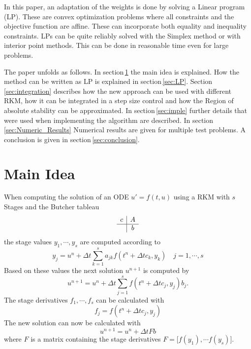 \documentclass[a4paper]{scrartcl}
\numberwithin{equation}{section}
\theoremstyle{plain}
\theoremstyle{definition}
\numberwithin{theorem}{section}
\newcommand{\dt}{{\Delta t}}
\newcommand{\1}{\mathbbm{1}}
\begin{document}
In this paper, an adaptation of the weights is done by solving a Linear program (LP).
These are convex optimization problems where all constraints and the objective function are affine. These can incorporate both equality and inequality constraints. 
LPs can be quite reliably solved with the Simplex method or with interior point methods. This can be done in reasonable time even for large problems. 
\cite{boyd_convex_2004}

The paper unfolds as follows. In section\,\ref{sec:main_idea} the main idea is explained. How the method can be written as LP is explained in section\,\ref{sec:LP}.
Section\,\ref{sec:integration} describes how the new approach can be used with different RKM, how it can be integrated in a step size control and how the Region of absolute stability can be approximated.  
In section\,\ref{sec:imple} further details that were used when implementing the algorithm are described.
In section\,\ref{sec:Numeric_Results} Numerical results are given for multiple test problems.
A conclusion is given in section\,\ref{sec:conclusion}.




\section{Main Idea}\label{sec:main_idea}

When computing the solution of an ODE $u ' = f(t,u) $ using a RKM with $s$ Stages and the Butcher tableau
\begin{align}
\begin{array}{c|c}
c &  A \\
\hline
 & b\\
\end{array}
\end{align}
the stage values $y_1,\cdots,y_s$ are computed according to
\begin{equation}
y_j =  u^n + \dt \sum_{k = 1}^{s} a_{jk} f(t^n + \dt c_k,y_k)  \quad j = 1,\cdots,s
\end{equation}
Based on these values the next solution $u^{n+1}$ is computed by
\begin{equation}
u^{n+1} = u^n + \dt \sum_{j  = 1}^s f(t^n + \dt c_j,y_j) b_j .
\end{equation}
The stage derivatives $f_1,\cdots,f_s$ can be calculated with
\begin{equation}
f_j = f(t^n + \dt c_j,y_j)
\end{equation}
The new solution can now be calculated with
\begin{equation}\label{eq:Combination}
u^{n+1} = u^n + \dt F b
\end{equation}
where $F$ is a matrix containing the stage derivatives $F = \big[f(y_1) , \cdots f(y_s)\big]$.
\end{document}
